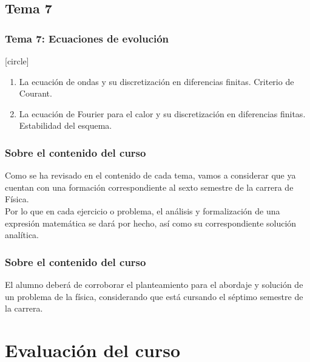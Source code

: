 \subsection*{Tema 7}
\begin{frame}
\frametitle{\textbf{Tema 7: Ecuaciones de evolución}}
[circle]
\begin{enumerate}[<+->]
\item La ecuación de ondas y su discretización en diferencias finitas. Criterio de Courant.
\item La ecuación de Fourier para el calor y su discretización en diferencias finitas. Estabilidad del esquema.
\end{enumerate}
\end{frame}
\begin{frame}
\frametitle{Sobre el contenido del curso}
Como se ha revisado en el contenido de cada tema, vamos a considerar que ya cuentan con una formación correspondiente al sexto semestre de la carrera de Física.
\\
\bigskip
\pause
Por lo que en cada ejercicio o problema, el análisis y formalización de una expresión matemática se dará por hecho, así como su correspondiente solución analítica.
\end{frame}
\begin{frame}
\frametitle{Sobre el contenido del curso}
El alumno deberá de corroborar el planteamiento para el abordaje y solución de un problema de la física, considerando que está cursando el séptimo semestre de la carrera.
\end{frame}
\section{Evaluación del curso}
